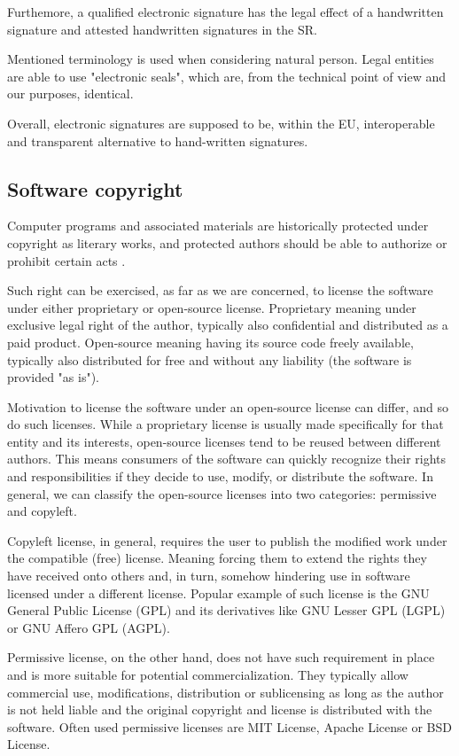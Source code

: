 \documentclass[thesismargins, english, thesislinespacing, twoside, openright, upjsfrontpage]{rnthesis}
\begin{document}
Furthemore, a qualified electronic signature has the legal effect of a handwritten signature \cite{4} and attested handwritten signatures in the SR.

Mentioned terminology is used when considering natural person. Legal entities are able to use "electronic seals", which are, from the technical point of view and our purposes, identical.

Overall, electronic signatures are supposed to be, within the EU, interoperable and transparent alternative to hand-written signatures.

\subsection{Software copyright}

Computer programs and associated materials are historically protected under copyright as literary works, and protected authors should be able to authorize or prohibit certain acts \cite{6}.

Such right can be exercised, as far as we are concerned, to license the software under either proprietary or open-source license.
Proprietary meaning under exclusive legal right of the author, typically also confidential and distributed as a paid product.
Open-source meaning having its source code freely available, typically also distributed for free and without any liability (the software is provided "as is").

Motivation to license the software under an open-source license can differ, and so do such licenses.
While a proprietary license is usually made specifically for that entity and its interests, open-source licenses tend to be reused between different authors.
This means consumers of the software can quickly recognize their rights and responsibilities if they decide to use, modify, or distribute the software.
In general, we can classify the open-source licenses into two categories: permissive and copyleft.

Copyleft license, in general, requires the user to publish the modified work under the compatible (free) license.
Meaning forcing them to extend the rights they have received onto others and, in turn, somehow hindering use in software licensed under a different license.
Popular example of such license is the GNU General Public License (GPL) and its derivatives like GNU Lesser GPL (LGPL) or GNU Affero GPL (AGPL).

Permissive license, on the other hand, does not have such requirement in place and is more suitable for potential commercialization.
They typically allow commercial use, modifications, distribution or sublicensing as long as the author is not held liable and the original copyright and license is distributed with the software.
Often used permissive licenses are MIT License, Apache License or BSD License.
\end{document}
